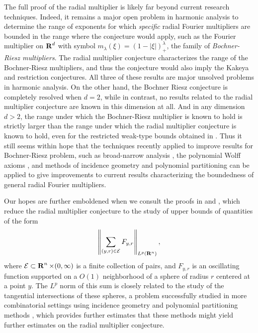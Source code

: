 The full proof of the radial multiplier is likely far beyond current research techniques. Indeed, it remains a major open problem in harmonic analysis to determine the range of exponents for which \emph{specific} radial Fourier multipliers are bounded in the range where the conjecture would apply, such as the Fourier multiplier on $\operatorname{\mathbf{R}}^d$ with symbol $m_\lambda(\xi) = \left( 1 - |\xi| \right)^\lambda_+$, the family of \emph{Bochner-Riesz multipliers}. The radial multiplier conjecture characterizes the range of the Bochner-Riesz multipliers, and thus the conjecture would also imply the Kakeya and restriction conjectures. All three of these results are major unsolved problems in harmonic analysis. On the other hand, the Bochner Riesz conjecture is completely resolved when $d = 2$, while in contrast, no results related to the radial multiplier conjecture are known in this dimension at all. And in any dimension $d > 2$, the range under which the Bochner-Riesz multiplier is known to hold \cite{GuoandOhandWangandWuandZhang} is strictly larger than the range under which the radial multiplier conjecture is known to hold, even for the restricted weak-type bounds obtained in \cite{Cladek}. Thus it still seems within hope that the techniques recently applied to improve results for Bochner-Riesz problem, such as broad-narrow analysis \cite{BourgainandGuth}, the polynomial Wolff axioms \cite{KatzandRogers}, and methods of incidence geometry and polynomial partitioning \cite{Zahl2} can be applied to give improvements to current results characterizing the boundedness of general radial Fourier multipliers.

Our hopes are further emboldened when we consult the proofs in \cite{HeoandNazarovandSeeger} and \cite{Cladek}, which reduce the radial multiplier conjecture to the study of upper bounds of quantities of the form
%
\[ \left\| \sum_{(y,r) \in \mathcal{E}} F_{y,r} \right\|_{L^p(\operatorname{\mathbf{R}}^n)}, \]
%
where $\mathcal{E} \subset \operatorname{\mathbf{R}}^n \times (0,\infty)$ is a finite collection of pairs, and $F_{y,r}$ is an oscillating function supported on a $O(1)$ neighborhood of a sphere of radius $r$ centered at a point $y$. The $L^p$ norm of this sum is closely related to the study of the tangential intersections of these spheres, a problem successfully studied in more combinatorial settings using incidence geometry and polynomial partitioning methods \cite{Zahl}, which provides further estimates that these methods might yield further estimates on the radial multiplier conjecture.

